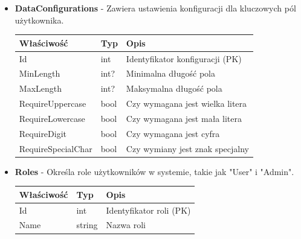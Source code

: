 \documentclass[12pt,a4paper]{article}
\begin{document}
\begin{itemize}
    \item \textbf{DataConfigurations} - Zawiera ustawienia konfiguracji dla kluczowych pól użytkownika.
    \begin{longtable}{|m{4cm}|m{2cm}|m{8cm}|}
        \hline
        \textbf{Właściwość} & \textbf{Typ} & \textbf{Opis} \\ \hline
        \endhead
        \hline
        Id & int & Identyfikator konfiguracji (PK) \\ \hline
        MinLength & int? & Minimalna długość pola \\ \hline
        MaxLength & int? & Maksymalna długość pola \\ \hline
        RequireUppercase & bool & Czy wymagana jest wielka litera \\ \hline
        RequireLowercase & bool & Czy wymagana jest mała litera \\ \hline
        RequireDigit & bool & Czy wymagana jest cyfra \\ \hline
        RequireSpecialChar & bool & Czy wymiany jest znak specjalny \\ \hline
    \end{longtable}

    \item \textbf{Roles} - Określa role użytkowników w systemie, takie jak "User" i "Admin".
    \begin{longtable}{|m{4cm}|m{2cm}|m{8cm}|}
        \hline
        \textbf{Właściwość} & \textbf{Typ} & \textbf{Opis} \\ \hline
        \endhead
        \hline
        Id & int & Identyfikator roli (PK) \\ \hline
        Name & string & Nazwa roli \\ \hline
    \end{longtable}


\end{itemize}
\end{document}
